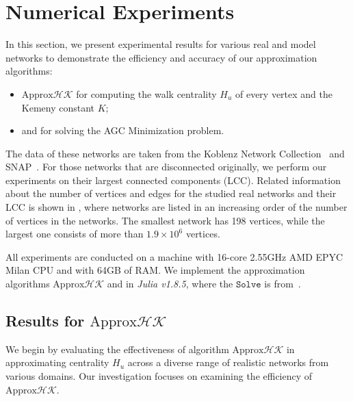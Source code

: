 \documentclass[10pt,twocolumn,twoside]{IEEEtran}
\begin{document}
\section{Numerical Experiments}

In this section, we present experimental results for various real and model networks to demonstrate the  efficiency and accuracy of our approximation algorithms:
\begin{itemize}
    \item \(\text{Approx}\mathcal{HK}\) for computing the walk centrality \(H_u\) of  every vertex and the Kemeny constant \(K\);
    \item {} and  for solving the AGC Minimization problem.
\end{itemize}

The data of these networks are taken from the Koblenz Network Collection~\cite{Ku13} and SNAP~\cite{LeKr14}. For those networks that are disconnected originally, we perform our experiments on their largest connected components (LCC). Related information about the number of vertices and edges for the studied real networks and their LCC is shown  in ,  where networks are listed in an increasing order of the number of vertices in the networks. The smallest network has 198 vertices, while the largest one consists of more than \(1.9 \times 10^{6}\) vertices.

All experiments are conducted on a machine with 16-core 2.55GHz AMD EPYC Milan CPU and with 64GB of RAM. We implement the approximation algorithms \(\text{Approx}\mathcal{HK}\) and  in \textit{Julia v1.8.5}, where the \(\mathtt{Solve}\) is from~\cite{GaKySp23}. %

\subsection{Results for \(\text{Approx}\mathcal{HK}\)}

We begin by evaluating the effectiveness of algorithm \(\text{Approx}\mathcal{HK}\) in approximating centrality \(H_u\) across a diverse range of realistic networks from various domains. Our investigation focuses on examining the efficiency of \(\text{Approx}\mathcal{HK}\).

\end{document}
